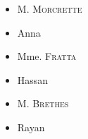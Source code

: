     \begin{minipage}{0.3\linewidth}
        \begin{makelistright}
            \begin{itemize}
                \item[\bullet] M. \textsc{Morcrette}
                \item[\bullet] Anna
                \item[\bullet] Mme. \textsc{Fratta}
                \item[\bullet] Hassan
                \item[\bullet] M. \textsc{Brethes}
                \item[\bullet] Rayan
            \end{itemize}
        \end{makelistright}
    \end{minipage}
    \hfill
